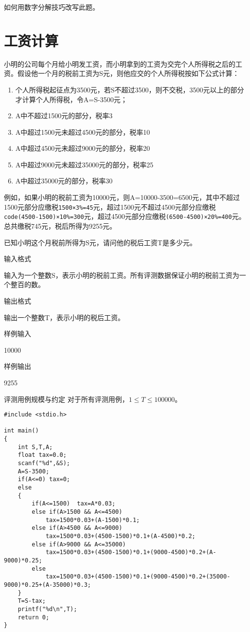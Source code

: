 \begin{note}[思考]
	如何用数字分解技巧改写此题。
\end{note}

\section{工资计算}
小明的公司每个月给小明发工资，而小明拿到的工资为交完个人所得税之后的工资。假设他一个月的税前工资为S元，则他应交的个人所得税按如下公式计算：
\begin{enumerate}
	\item 个人所得税起征点为3500元，若S不超过3500，则不交税，3500元以上的部分才计算个人所得税，令A=S-3500元；
	\item A中不超过1500元的部分，税率3%
	\item A中超过1500元未超过4500元的部分，税率10%
	\item A中超过4500元未超过9000元的部分，税率20%
	\item A中超过9000元未超过35000元的部分，税率25%
	\item A中超过35000元的部分，税率30%
\end{enumerate}
例如，如果小明的税前工资为10000元，则A=10000-3500=6500元，其中不超过1500元部分应缴税\lstinline|1500×3%=45|元，超过1500元不超过4500元部分应缴税\lstinline|code(4500-1500)×10%=300|元，超过4500元部分应缴税\lstinline|(6500-4500)×20%=400|元。总共缴税745元，税后所得为9255元。

已知小明这个月税前所得为S元，请问他的税后工资T是多少元。

输入格式

输入为一个整数S，表示小明的税前工资。所有评测数据保证小明的税前工资为一个整百的数。

输出格式

输出一个整数T，表示小明的税后工资。

样例输入

10000

样例输出

9255

评测用例规模与约定
对于所有评测用例，$1\le T\le 100000$。

\begin{lstlisting}
#include <stdio.h>

int main()
{
	int S,T,A;
	float tax=0.0;
	scanf("%d",&S);
	A=S-3500;
	if(A<=0) tax=0;
	else
	{
		if(A<=1500)  tax=A*0.03;	
		else if(A>1500 && A<=4500) 
			tax=1500*0.03+(A-1500)*0.1;
		else if(A>4500 && A<=9000) 
			tax=1500*0.03+(4500-1500)*0.1+(A-4500)*0.2;
		else if(A>9000 && A<=35000) 
			tax=1500*0.03+(4500-1500)*0.1+(9000-4500)*0.2+(A-9000)*0.25;
		else 
			tax=1500*0.03+(4500-1500)*0.1+(9000-4500)*0.2+(35000-9000)*0.25+(A-35000)*0.3;
	} 
	T=S-tax;
	printf("%d\n",T);
	return 0;
} 
\end{lstlisting}

